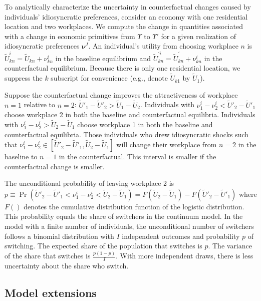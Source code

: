 \documentclass[11pt]{article}
\theoremstyle{definition}
\newcommand\idiosyncraticphrase{idiosyncratic preference}
\begin{document}
To analytically characterize the uncertainty in counterfactual changes caused by individuals' \idiosyncraticphrase s,
consider an economy with one residential location and two workplaces.
We compute the change in quantities associated with a change in economic primitives from $\Upsilon$ to $\Upsilon'$ 
for a given realization of \idiosyncraticphrase s $\boldsymbol \nu^{I}$.
An individual's utility from choosing workplace $n$ is
$\tilde{U}^{i}_{kn} = \tilde{U}_{kn} + \nu^{i}_{kn}$
in the baseline equilibrium
and
$\tilde{U}^{'i}_{kn} = \tilde{U}^{'}_{kn} + \nu^{i}_{kn}$
in the counterfactual equilibrium.
Because there is only one residential location, we suppress the $k$ subscript for convenience (e.g., denote $\tilde{U}_{k1}$ by $\tilde{U}_{1}$).

Suppose the counterfactual change improves the attractiveness of workplace $n=1$ relative to $n=2$:
$\tilde{U}'_{1} - \tilde{U}'_{2} > \tilde{U}_{1} - \tilde{U}_{2}$.
Individuals with $\nu^{i}_{1} - \nu^{i}_{2} < \tilde{U}'_{2} - \tilde{U}'_{1} $ choose workplace 2 in both the baseline and counterfactual equilibria.
Individuals with $\nu^{i}_{1} - \nu^{i}_{2} > \tilde{U}_{2} - \tilde{U}_{1} $ choose workplace 1 in both the baseline and counterfactual equilibria.
Those individuals who drew idiosyncratic shocks such that 
$
\nu^{i}_{1} - \nu^{i}_{2} \in \left[\tilde{U}'_{2} - \tilde{U}'_{1},\tilde{U}_{2} - \tilde{U}_{1}\right]
$
will change their workplace from $n=2$ in the baseline to $n=1$ in the counterfactual.
This interval is smaller if the counterfactual change is smaller.

The unconditional probability of leaving workplace 2 is
$
p
\equiv
\Pr\left(\tilde{U}'_{2} - \tilde{U}'_{1} < \nu^{i}_{1} - \nu^{i}_{2} < \tilde{U}_{2} - \tilde{U}_{1}\right)
=
F\left(\tilde{U}_{2} - \tilde{U}_{1}\right) - F\left(\tilde{U}'_{2} - \tilde{U}'_{1}\right)
$
where $F()$ denotes the cumulative distribution function of the logistic distribution.
This probability equals the share of switchers in the continuum model.
In the model with a finite number of individuals,
the unconditional number of switchers follows a binomial distribution with
$I$ independent outcomes and probability $p$ of switching.
The expected share of the population that switches is $p$.
The variance of the share that switches is $\frac{p(1-p)}{I}$.
With more independent draws, there is less uncertainty about the share who switch.

\subsection{Model extensions}\label{sec:appendix:theory:extensions}
\end{document}

